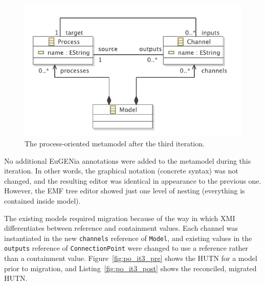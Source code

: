 \begin{figure}[htbp]
	\centering
		\includegraphics[scale=0.75]{A.2.ProcessOriented/images/3_mm.pdf}
	\caption{The process-oriented metamodel after the third iteration.}
	\label{fig:po_it3_mm}
\end{figure}

No additional EuGENia annotations were added to the metamodel during this iteration. In other words, the graphical notation (concrete syntax) was not changed, and the resulting editor was identical in appearance to the previous one. However, the EMF tree editor showed just one level of nesting (everything is contained inside model).

The existing models required migration because of the way in which XMI differentiates between reference and containment values. Each channel was instantiated in the new \texttt{ch\-an\-ne\-ls} reference of \texttt{Mo\-d\-el}, and existing values in the \texttt{ou\-tp\-u\-ts} reference of \texttt{Co\-nn\-ec\-ti\-onPo\-in\-t} were changed to use a reference rather than a containment value. Figure~\ref{fig:po_it3_pre} shows the HUTN for a model prior to migration, and Listing~\ref{fig:po_it3_post} shows the reconciled, migrated HUTN.

